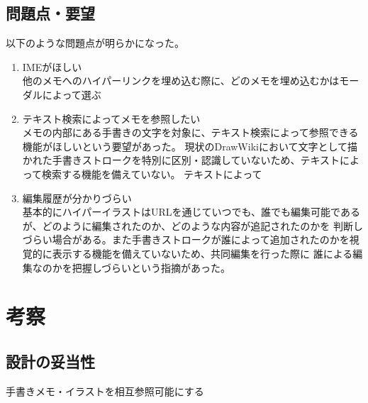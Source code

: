 \subsection{問題点・要望}
以下のような問題点が明らかになった。
\begin{enumerate}
    \item IMEがほしい\\
    他のメモへのハイパーリンクを埋め込む際に、どのメモを埋め込むかはモーダルによって選ぶ
    \item テキスト検索によってメモを参照したい\\
    メモの内部にある手書きの文字を対象に、テキスト検索によって参照できる機能がほしいという要望があった。
    現状のDrawWikiにおいて文字として描かれた手書きストロークを特別に区別・認識していないため、テキストによって検索する機能を備えていない。
    テキストによって
    \item 編集履歴が分かりづらい\\
    基本的にハイパーイラストはURLを通じていつでも、誰でも編集可能であるが、どのように編集されたのか、どのような内容が追記されたのかを
    判断しづらい場合がある。また手書きストロークが誰によって追加されたのかを視覚的に表示する機能を備えていないため、共同編集を行った際に
    誰による編集なのかを把握しづらいという指摘があった。
\end{enumerate}

\section{考察}

\subsection{設計の妥当性}
手書きメモ・イラストを相互参照可能にする

